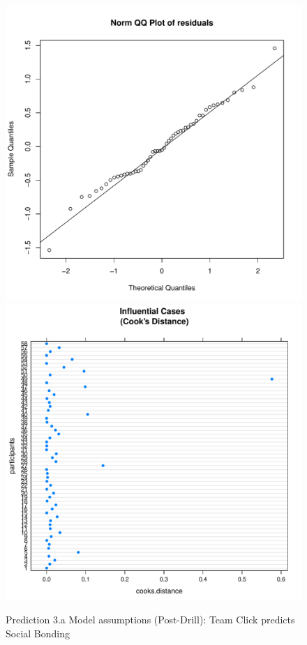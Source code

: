 \begin{CJK}{UTF8}{gbsn}
\begin{figure}[htbp]
    \includegraphics[scale =.4]{images/TEM2QQNorm.pdf}
    \includegraphics[scale =.4]{images/TEM2CooksD.pdf}
    \caption{Prediction 3.a Model assumptions (Post-Drill): Team Click predicts Social Bonding}
    \label{fig:M2aAssumptions}
\end{figure}




\end{CJK}

